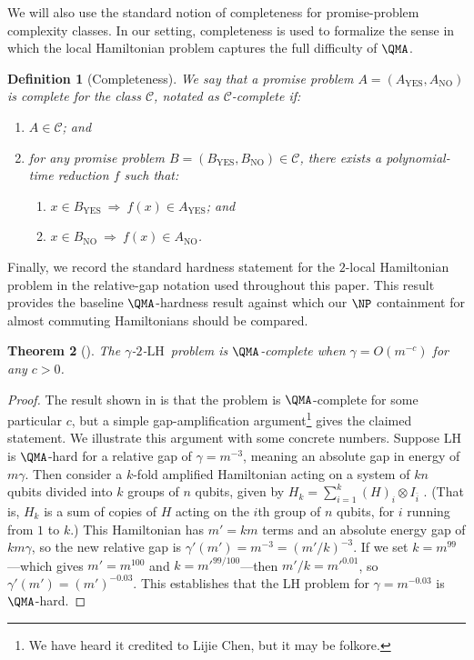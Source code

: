 \documentclass[a4paper,onecolumn,11pt]{quantumarticle}
\theoremstyle{plain}
\newtheorem{theorem}{Theorem}[section]
\newtheorem{definition}[theorem]{Definition}
\newcommand{\kLH}{$\gamma$-$2$-$\mathrm{LH}$}
\begin{document}
We will also use the standard notion of completeness for promise-problem complexity classes.  In our setting, completeness is used to formalize the sense in which the local Hamiltonian problem captures the full difficulty of $\QMA$.

\begin{definition}[Completeness]
    We say that a promise problem $A = \left(A_{\mathrm{YES}}, A_{\mathrm{NO}}\right)$ is complete for the class $\mathcal{C}$, notated as $\mathcal{C}$-complete if:
    \begin{enumerate}
        \item $A \in \mathcal{C}$; and
        \item for any promise problem $B = \left(B_{\mathrm{YES}}, B_{\mathrm{NO}}\right) \in \mathcal{C}$, there exists a polynomial-time reduction $f$ such that:
        \begin{enumerate}
            \item $x \in B_{\mathrm{YES}} \: \Longrightarrow \: f(x) \in A_{\mathrm{YES}}$; and
            \item $x \in B_{\mathrm{NO}} \: \Longrightarrow \: f(x) \in A_{\mathrm{NO}}$.
        \end{enumerate}
    \end{enumerate}
\end{definition}

Finally, we record the standard hardness statement for the $2$-local Hamiltonian problem in the relative-gap notation used throughout this paper.  This result provides the baseline $\QMA$-hardness result against which our $\NP$ containment for almost commuting Hamiltonians should be compared.

\begin{theorem}[\cite{kkr}]
    The \kLH\ problem is $\QMA$-complete when $\gamma = O(m^{-c})$ for any $c > 0$.
\end{theorem}
\begin{proof} The result shown in \cite{kkr} is that the problem is $\QMA$-complete for some particular $c$, but a simple gap-amplification argument\footnote{We have heard it credited to Lijie Chen, but it may be folkore.} gives the claimed statement. We illustrate this argument with some concrete numbers. Suppose LH is $\QMA$-hard for a relative gap of $\gamma = m^{-3} $, meaning an absolute gap in energy of $m \gamma$. Then consider a $k$-fold amplified Hamiltonian acting on a system of $kn$ qubits divided into $k$ groups of $n$ qubits, given by $H_k = \sum_{i=1}^{k} (H)_i \otimes I_{\bar{i}}$ . (That is, $H_k$ is a sum of copies of $H$ acting on the $i$th group of $n$ qubits, for $i$ running from $1$ to $k$.) This Hamiltonian has $m' = km$ terms and an absolute energy gap of $km\gamma$, so the new relative gap is $\gamma'(m') = m^{-3} = (m'/k)^{-3}$. If we set $k = m^{99}$---which gives $m' = m^{100}$ and $k = m'^{99/100}$---then $m'/k = m'^{0.01}$, so $\gamma'(m') =(m')^{-0.03}$. This establishes that the LH problem for $\gamma = m^{-0.03}$ is $\QMA$-hard.
\end{proof}
\end{document}
